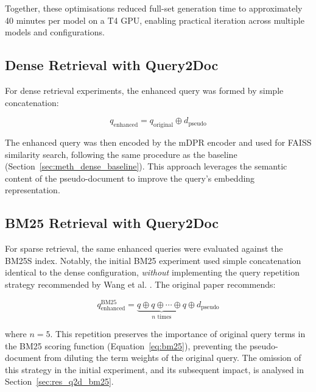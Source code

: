 Together, these optimisations reduced full-set generation time to approximately 40 minutes per model on a T4 GPU, enabling practical iteration across multiple models and configurations.

\subsection{Dense Retrieval with Query2Doc}
\label{sec:meth_q2d_dense}

For dense retrieval experiments, the enhanced query was formed by simple concatenation:

\begin{equation}
    q_{\text{enhanced}} = q_{\text{original}} \oplus d_{\text{pseudo}}
    \label{eq:q2d_dense}
\end{equation}

The enhanced query was then encoded by the mDPR encoder and used for FAISS similarity search, following the same procedure as the baseline (Section~\ref{sec:meth_dense_baseline}). This approach leverages the semantic content of the pseudo-document to improve the query's embedding representation.

\subsection{BM25 Retrieval with Query2Doc}
\label{sec:meth_q2d_bm25}

For sparse retrieval, the same enhanced queries were evaluated against the BM25S index. Notably, the initial BM25 experiment used simple concatenation identical to the dense configuration, \emph{without} implementing the query repetition strategy recommended by Wang et al. \cite{wang_2023_query2doc}. The original paper recommends:

\begin{equation}
    q_{\text{enhanced}}^{\text{BM25}} = \underbrace{q \oplus q \oplus \cdots \oplus q}_{n \text{ times}} \oplus d_{\text{pseudo}}
    \label{eq:q2d_bm25}
\end{equation}

\noindent where $n=5$. This repetition preserves the importance of original query terms in the BM25 scoring function (Equation~\ref{eq:bm25}), preventing the pseudo-document from diluting the term weights of the original query. The omission of this strategy in the initial experiment, and its subsequent impact, is analysed in Section~\ref{sec:res_q2d_bm25}.

